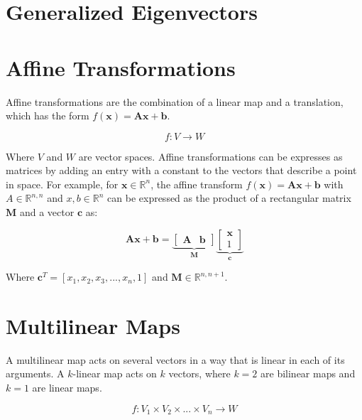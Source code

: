 \section{Generalized Eigenvectors}

\section{Affine Transformations}

Affine transformations are the combination of a linear map and a translation, which has the form $f(\mathbf{x}) = \mathbf{A}\mathbf{x} + \mathbf{b}$. 

\begin{equation}
f: V \rightarrow W
\end{equation}

Where $V$ and $W$ are vector spaces. Affine transformations can be expresses as matrices by adding an entry with a constant to the vectors that describe a point in space. For example, for $\mathbf{x} \in \mathbb{R}^n$,  the affine transform $f(\mathbf{x}) = \mathbf{A}\mathbf{x} + \mathbf{b}$ with $A\in\mathbb{R}^{n,n}$ and $x,b \in \mathbb{R}^{n}$ can be expressed as the product of a rectangular matrix $\mathbf{M}$ and a vector $\mathbf{c}$ as:

\begin{equation}
\mathbf{A}\mathbf{x} + \mathbf{b} = \underbrace{\left[\begin{array}{c|c} \mathbf{A} & \mathbf{b} \end{array}\right]}_{\mathbf{M}} \underbrace{\left[\begin{array}{c} \mathbf{x} \\ 1\end{array} \right]}_{\mathbf{c}}
\end{equation}

Where $\mathbf{c}^T = \left[x_1,x_2,x_3,...,x_n,1\right]$ and $\mathbf{M} \in \mathbb{R}^{n,n+1}$.

\section{Multilinear Maps}

A multilinear map acts on several vectors in a way that is linear in each of its arguments. A $k$-linear map acts on $k$ vectors, where $k=2$ are bilinear maps and $k=1$ are linear maps.

\begin{equation}	
f: V_1 \times V_2 \times ... \times V_n \rightarrow W
\end{equation}

